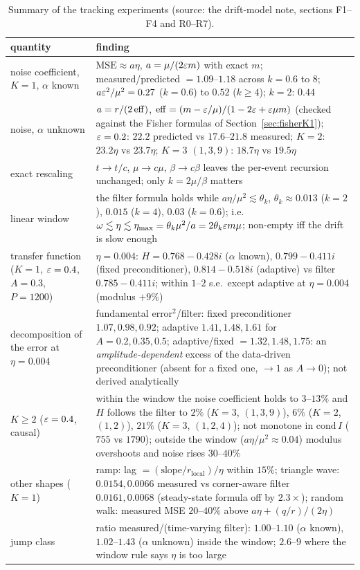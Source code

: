 \begin{table}[h]
\centering\small
\begin{tabular}{@{}p{4.2cm}p{9.6cm}@{}}\toprule
quantity & finding\\\midrule
noise coefficient, $K=1$, $\alpha$ known & $\mathrm{MSE}\approx a\eta$, $a=\mu/(2\varepsilon m)$ with exact $m$; measured/predicted $=1.09$--$1.18$ across $k=0.6$ to $8$; $a\varepsilon^2/\mu^2=0.27$ ($k=0.6$) to $0.52$ ($k\ge4$); $k=2$: $0.44$\\
noise, $\alpha$ unknown & $a=r/(2\,\mathrm{eff})$, $\mathrm{eff}=(m-\varepsilon/\mu)/(1-2\varepsilon+\varepsilon\mu m)$ (checked against the Fisher formulas of Section~\ref{sec:fisherK1}); $\varepsilon=0.2$: $22.2$ predicted vs $17.6$--$21.8$ measured; $K=2$: $23.2\eta$ vs $23.7\eta$; $K=3$ $(1,3,9)$: $18.7\eta$ vs $19.5\eta$\\
exact rescaling & $t\to t/c$, $\mu\to c\mu$, $\beta\to c\beta$ leaves the per-event recursion unchanged; only $k=2\mu/\beta$ matters\\
linear window & the filter formula holds while $a\eta/\mu^2\lesssim\theta_k$, $\theta_k\approx0.013$ ($k=2$), $0.015$ ($k=4$), $0.03$ ($k=0.6$); i.e.\ $\omega\lesssim\eta\lesssim\eta_{\max}=\theta_k\mu^2/a=2\theta_k\varepsilon m\mu$; non-empty iff the drift is slow enough\\
transfer function ($K=1$, $\varepsilon=0.4$, $A=0.3$, $P=1200$) & $\eta=0.004$: $H=0.768-0.428i$ ($\alpha$ known), $0.799-0.411i$ (fixed preconditioner), $0.814-0.518i$ (adaptive) vs filter $0.785-0.411i$; within $1$--$2$ s.e.\ except adaptive at $\eta=0.004$ (modulus $+9\%$)\\
decomposition of the error at $\eta=0.004$ & fundamental error$^2$/filter: fixed preconditioner $1.07,0.98,0.92$; adaptive $1.41,1.48,1.61$ for $A=0.2,0.35,0.5$; adaptive/fixed $=1.32,1.48,1.75$: an \emph{amplitude-dependent} excess of the data-driven preconditioner (absent for a fixed one, $\to1$ as $A\to0$); not derived analytically\\
$K\ge2$ ($\varepsilon=0.4$, causal) & within the window the noise coefficient holds to $3$--$13\%$ and $H$ follows the filter to $2\%$ ($K=3$, $(1,3,9)$), $6\%$ ($K=2$, $(1,2)$), $21\%$ ($K=3$, $(1,2,4)$); not monotone in $\mathrm{cond}\,I$ ($755$ vs $1790$); outside the window ($a\eta/\mu^2\approx0.04$) modulus overshoots and noise rises $30$--$40\%$\\
other shapes ($K=1$) & ramp: lag $=(\text{slope}/r_{\mathrm{local}})/\eta$ within $15\%$; triangle wave: $0.0154,0.0066$ measured vs corner-aware filter $0.0161,0.0068$ (steady-state formula off by $2.3\times$); random walk: measured MSE $20$--$40\%$ above $a\eta+(q/r)/(2\eta)$\\
jump class & ratio measured/(time-varying filter): $1.00$--$1.10$ ($\alpha$ known), $1.02$--$1.43$ ($\alpha$ unknown) inside the window; $2.6$--$9$ where the window rule says $\eta$ is too large\\\bottomrule
\end{tabular}
\caption{Summary of the tracking experiments (source: the drift-model note, sections F1--F4 and R0--R7).}\label{tab:track}
\end{table}

